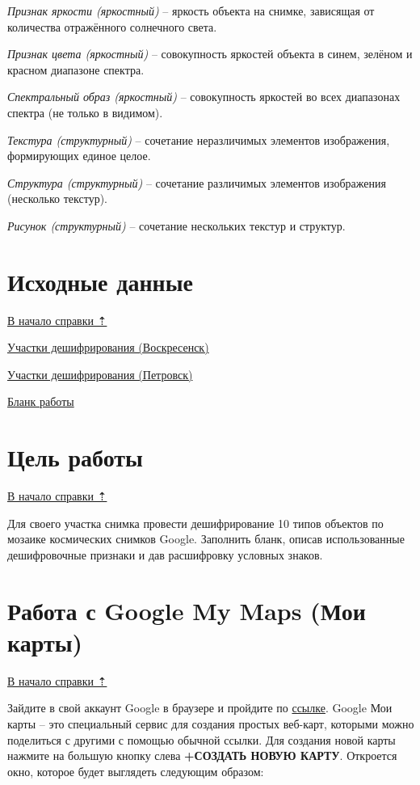 \documentclass[
  12pt,
]{book}
\begin{document}
\emph{Признак яркости (яркостный)} -- яркость объекта на снимке, зависящая от количества отражённого солнечного света.

\emph{Признак цвета (яркостный)} -- совокупность яркостей объекта в синем, зелёном и красном диапазоне спектра.

\emph{Спектральный образ (яркостный)} -- совокупность яркостей во всех диапазонах спектра (не только в видимом).

\emph{Текстура (структурный)} -- сочетание неразличимых элементов изображения, формирующих единое целое.

\emph{Структура (структурный)} -- сочетание различимых элементов изображения (несколько текстур).

\emph{Рисунок (структурный)} -- сочетание нескольких текстур и структур.

\section{Исходные данные}\label{interpretation-data}

\hyperref[interpretation]{В начало справки ⇡}

\href{https://yadi.sk/d/eOVRxRZiEh_PWQ}{Участки дешифрирования (Воскресенск)}

\href{https://disk.yandex.ru/d/_00irQJ8Kw3bWQ}{Участки дешифрирования (Петровск)}

\href{https://yadi.sk/i/x5atjx5eSHcTGw}{Бланк работы}

\section{Цель работы}\label{interpretation-task}

\hyperref[interpretation]{В начало справки ⇡}

Для своего участка снимка провести дешифрирование 10 типов объектов по мозаике космических снимков Google. Заполнить бланк, описав использованные дешифровочные признаки и дав расшифровку условных знаков.

\section{Работа с Google My Maps (Мои карты)}\label{interpretation-google}

\hyperref[interpretation]{В начало справки ⇡}

Зайдите в свой аккаунт Google в браузере и пройдите по \href{https://www.google.com/maps/d/u/0/?hl=ru}{ссылке}. Google Мои карты -- это специальный сервис для создания простых веб-карт, которыми можно поделиться с другими с помощью обычной ссылки. Для создания новой карты нажмите на большую кнопку слева \textbf{+СОЗДАТЬ НОВУЮ КАРТУ}. Откроется окно, которое будет выглядеть следующим образом:
\end{document}
